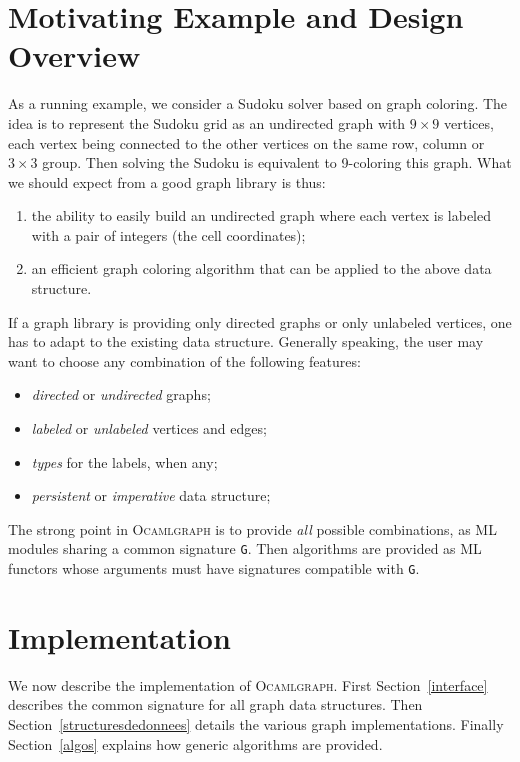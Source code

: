 \documentclass[tfpsymp]{tfp05symp}
\newcommand{\ocamlgraph}{\textsc{Ocamlgraph}\xspace}
\begin{document}
\section{Motivating Example and Design Overview}

As a running example, we consider a Sudoku solver based on graph
coloring.  The idea is to represent the Sudoku grid as an undirected
graph with $9\times 9$ vertices, each vertex being connected to the
other vertices on the same row, column or $3\times 3$ group. Then
solving the Sudoku is equivalent to 9-coloring this graph.
What we should expect from a good graph library is thus:
\begin{enumerate}
\item the ability to easily build an undirected graph where each
  vertex is labeled with a pair of integers (the cell coordinates);
\item an efficient graph coloring algorithm that can be applied to the
  above data structure. 
\end{enumerate}
If a graph library is providing only directed graphs or only
unlabeled vertices, one has to adapt to the existing data structure.
Generally speaking, the user may want
to choose any combination of the following features:
\begin{itemize}
\item \emph{directed} or \emph{undirected} graphs;
\item \emph{labeled} or \emph{unlabeled} vertices and edges;
\item \emph{types} for the labels, when any;
\item \emph{persistent} or \emph{imperative} data structure;
\end{itemize}
The strong point in \ocamlgraph is to provide \emph{all} possible
combinations, as ML modules sharing a common signature \texttt{G}.
Then algorithms are provided as ML functors whose arguments must have
signatures compatible with \texttt{G}.

\section{Implementation}

We now describe the implementation of
\ocamlgraph. First Section~\ref{interface} describes the common
signature for all graph data structures.
Then Section~\ref{structuresdedonnees} details the various graph
implementations. Finally Section~\ref{algos} explains how
generic algorithms are provided.
\end{document}
